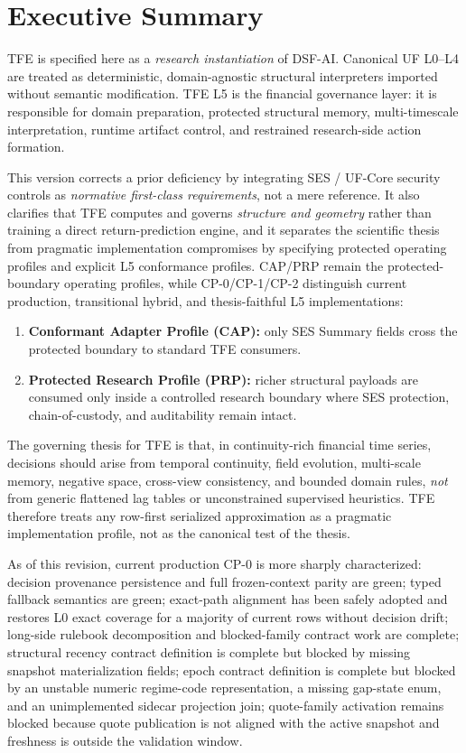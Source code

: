 \documentclass[11pt]{report}
\begin{document}
\tableofcontents
\clearpage

\chapter*{Executive Summary}
TFE is specified here as a \emph{research instantiation} of DSF-AI. Canonical UF L0--L4 are treated as deterministic, domain-agnostic structural interpreters imported without semantic modification. TFE L5 is the financial governance layer: it is responsible for domain preparation, protected structural memory, multi-timescale interpretation, runtime artifact control, and restrained research-side action formation.

This version corrects a prior deficiency by integrating SES / UF-Core security controls as \emph{normative first-class requirements}, not a mere reference. It also clarifies that TFE computes and governs \emph{structure and geometry} rather than training a direct return-prediction engine, and it separates the scientific thesis from pragmatic implementation compromises by specifying protected operating profiles and explicit L5 conformance profiles. CAP/PRP remain the protected-boundary operating profiles, while CP-0/CP-1/CP-2 distinguish current production, transitional hybrid, and thesis-faithful L5 implementations:
\begin{enumerate}[leftmargin=1.2cm]
    \item \textbf{Conformant Adapter Profile (CAP):} only SES Summary fields cross the protected boundary to standard TFE consumers.
    \item \textbf{Protected Research Profile (PRP):} richer structural payloads are consumed only inside a controlled research boundary where SES protection, chain-of-custody, and auditability remain intact.
\end{enumerate}

The governing thesis for TFE is that, in continuity-rich financial time series, decisions should arise from temporal continuity, field evolution, multi-scale memory, negative space, cross-view consistency, and bounded domain rules, \emph{not} from generic flattened lag tables or unconstrained supervised heuristics. TFE therefore treats any row-first serialized approximation as a pragmatic implementation profile, not as the canonical test of the thesis.

As of this revision, current production CP-0 is more sharply characterized: decision provenance persistence and full frozen-context parity are green; typed fallback semantics are green; exact-path alignment has been safely adopted and restores L0 exact coverage for a majority of current rows without decision drift; long-side rulebook decomposition and blocked-family contract work are complete; structural recency contract definition is complete but blocked by missing snapshot materialization fields; epoch contract definition is complete but blocked by an unstable numeric regime-code representation, a missing gap-state enum, and an unimplemented sidecar projection join; quote-family activation remains blocked because quote publication is not aligned with the active snapshot and freshness is outside the validation window.
\end{document}
